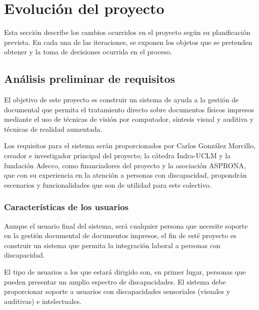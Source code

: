 \section{Evolución del proyecto}
Esta sección describe los cambios ocurridos en el proyecto según su planificación prevista. En cada una de las iteraciones, se exponen los objetos que se pretenden obtener y la toma de decisiones ocurrida en el proceso.


\subsection{Análisis preliminar de requisitos}
El objetivo de este proyecto es construir un sistema de ayuda a la gestión de documental que permita el tratamiento directo sobre documentos físicos impresos mediante el uso de técnicas de visión por computador, síntesis visual y auditiva y técnicas de realidad aumentada.

Los requisitos para el sistema serán proporcionados por Carlos González Morcillo, creador e investigador principal del proyecto; la cátedra Indra-UCLM y la fundación Adecco, como financiadores del proyecto y la asociación ASPRONA, que con su experiencia en la atención a personas con discapacidad, propondrán escenarios y funcionalidades que son de utilidad para este colectivo. 

\subsubsection{Características de los usuarios}
Aunque el usuario final del sistema, será cualquier persona que necesite soporte en la gestión documental de documentos impresos, el fin de esté proyecto es construir un sistema que permita la integración laboral a personas con discapacidad. 

El tipo de usuarios a los que estará dirigido son, en primer lugar, personas que pueden presentar un amplio espectro de discapacidades. El sistema debe proporcionar soporte a usuarios con discapacidades sensoriales (visuales y auditivas) e intelectuales.  

